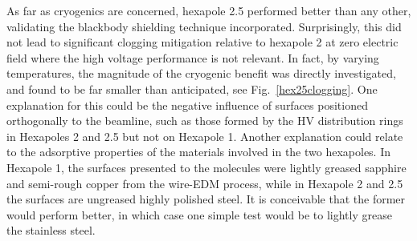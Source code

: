 As far as cryogenics are concerned, hexapole 2.5 performed better than any other, validating the blackbody shielding technique incorporated.
Surprisingly, this did not lead to significant clogging mitigation relative to hexapole 2 at zero electric field where the high voltage performance is not relevant.
In fact, by varying temperatures, the magnitude of the cryogenic benefit was directly investigated, and found to be far smaller than anticipated, see Fig.~\ref{hex25clogging}.
One explanation for this could be the negative influence of surfaces positioned orthogonally to the beamline, such as those formed by the HV distribution rings in Hexapoles 2 and 2.5 but not on Hexapole 1.
Another explanation could relate to the adsorptive properties of the materials involved in the two hexapoles.
In Hexapole 1, the surfaces presented to the molecules were lightly greased sapphire and semi-rough copper from the wire-EDM process, while in Hexapole 2 and 2.5 the surfaces are ungreased highly polished steel.
It is conceivable that the former would perform better, in which case one simple test would be to lightly grease the stainless steel.



